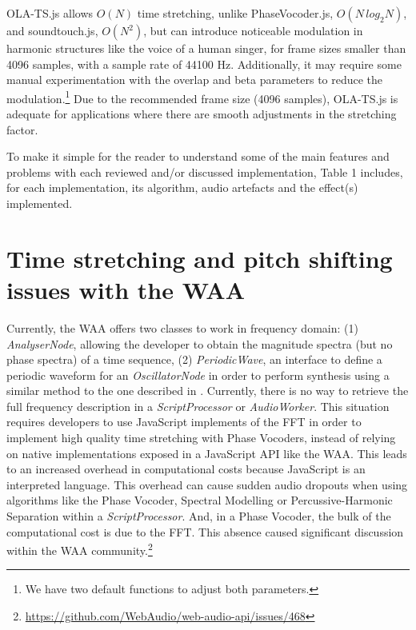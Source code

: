 \documentclass{sig-alternate}
\begin{document}
\begin{sloppypar}
OLA-TS.js allows $O(N)$ time stretching, unlike PhaseVocoder.js, $O(N\,log_{2} N)$, and soundtouch.js, $O(N^2)$, but can introduce noticeable modulation in harmonic structures like the voice of a human singer, for frame sizes smaller than 4096 samples, with a sample rate of 44100 Hz. Additionally, it may require some manual experimentation with the overlap and beta parameters to reduce the modulation.\footnote{We have two default functions to adjust both parameters.} Due to the recommended frame size (4096 samples), OLA-TS.js is adequate for applications where there are smooth adjustments in the stretching factor.

To make it simple for the reader to understand some of the main features and problems with each reviewed and/or discussed implementation, Table 1 includes, for each implementation, its algorithm, audio artefacts and the effect(s) implemented.
\end{sloppypar}

\section{Time stretching and pitch shifting issues with the WAA}

Currently, the WAA offers two classes to work in frequency domain: (1) \textit{AnalyserNode}, allowing the developer to obtain the magnitude spectra (but no phase spectra) of a time sequence, (2) \textit{PeriodicWave}, an interface to define a periodic waveform for an \textit{OscillatorNode} in order to perform synthesis using a similar method to the one described in \cite{moorer1976the}. Currently, there is no way to retrieve the full frequency description in a \textit{ScriptProcessor} or \textit{AudioWorker}. This situation requires  developers to use JavaScript implements of the FFT in order to implement high quality time stretching with Phase Vocoders, instead of relying on native implementations exposed in a JavaScript API like the WAA. This leads to an increased overhead in computational costs because JavaScript is an interpreted language. This overhead can cause sudden audio dropouts when using algorithms like the Phase Vocoder, Spectral Modelling or Percussive-Harmonic Separation \cite{Tachibana:2014:HSS:2719949.2719982} within a \textit{ScriptProcessor}. And, in a Phase Vocoder, the bulk of the computational cost is due to the FFT. This absence caused significant discussion within the WAA community.\footnote{\url{https://github.com/WebAudio/web-audio-api/issues/468}}
\end{document}
